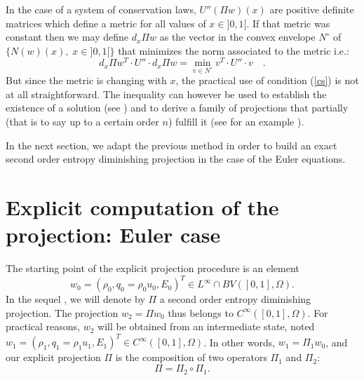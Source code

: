 \documentclass{fldauth}
\theoremstyle{plain}
\theoremstyle{plain}
\theoremstyle{plain}
\theoremstyle{plain}
\theoremstyle{plain}
\theoremstyle{plain}
\begin{document}
In the case of a system of conservation laws, \( U''(\Pi w)(x) \) are positive
definite matrices which define a metric for all values of \( x\in ]0,1[ \).
If that metric was constant then we may define \( d_{x}\Pi w \) as the vector
in the convex envelope \( N^{\circ } \) of \( \{N(w)(x),\; x\in ]0,1[\} \)
that minimizes the norm associated to the metric i.e.:
\begin{equation}
d_{x}\Pi w^{T}\cdot U''\cdot d_{x}\Pi w=\min _{v\in N^{\circ }}v^{T}\cdot U''\cdot v\quad .
\end{equation}
 But since the metric is changing with \( x \), the practical use of condition
(\ref{cs}) is not at all straightforward. The inequality can however be used
to establish the existence of a solution (see \cite{coquel_lefloch95}) and
to derive a family of projections that partially (that is to say up to a certain
order \( n \)) fulfill it (see for an example \cite{coquel_lefloch95}).

In the next section, we adapt the previous method in order to build an exact
second order entropy diminishing projection in the case of the Euler equations.


\section{Explicit computation of the projection: Euler case\label{expl}}

The starting point of the explicit projection procedure is an element
\[
w_{0}=(\rho _{0},q_{0}=\rho _{0}u_{0},E_{0})^{T}\in L^{\infty }\cap BV([0,1],\Omega ).\]
In the sequel , we will denote by \( \Pi  \) a second order entropy diminishing
projection. The projection \( w_{2}=\Pi w_{0} \) thus belongs to \( C^{\infty }([0,1],\Omega ). \)
For practical reasons, \( w_{2} \) will be obtained from an intermediate state,
noted \( w_{1}=(\rho _{1},q_{1}=\rho _{1}u_{1},E_{1})^{T}\in C^{\infty }([0,1],\Omega ) \).
In other words, \( w_{1}=\Pi _{1}w_{0} \), and our explicit projection \( \Pi  \)
is the composition of two operators \( \Pi _{1} \) and \( \Pi _{2} \):
\[
\Pi =\Pi _{2}\circ \Pi _{1}.\]
\end{document}

